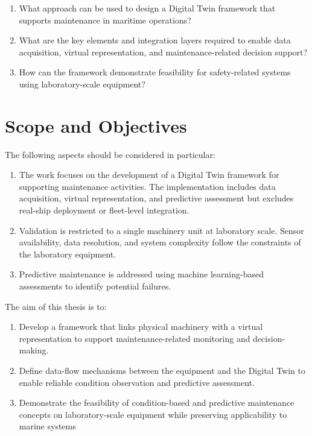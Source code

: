 \begin{enumerate}
    \item What approach can be used to design a Digital Twin framework that supports maintenance in maritime operations?
    \item What are the key elements and integration layers required to enable data acquisition, virtual representation, and maintenance-related decision support?
    \item How can the framework demonstrate feasibility for safety-related systems using laboratory-scale equipment?
\end{enumerate}


\section{Scope and Objectives}
\label{section:scope-and-objectives}

The following aspects should be considered in particular:
\begin{enumerate}
    \item The work focuses on the development of a Digital Twin framework for supporting maintenance activities. The implementation includes data acquisition, virtual representation, and predictive assessment but excludes real-ship deployment or fleet-level integration.
    \item Validation is restricted to a single machinery unit at laboratory scale. Sensor availability, data resolution, and system complexity follow the constraints of the laboratory equipment.
    \item Predictive maintenance is addressed using machine learning-based assessments to identify potential failures.
\end{enumerate}

The aim of this thesis is to:
\begin{enumerate}
    \item Develop a framework that links physical machinery with a virtual representation to support maintenance-related monitoring and decision-making.
    \item Define data-flow mechanisms between the equipment and the Digital Twin to enable reliable condition observation and predictive assessment.
    \item Demonstrate the feasibility of condition-based and predictive maintenance concepts on laboratory-scale equipment while preserving applicability to marine systems
\end{enumerate}


